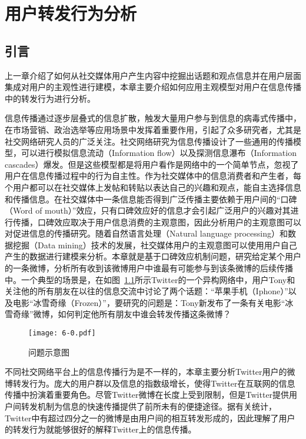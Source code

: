 \chapter{用户转发行为分析}
\label{ch6}

\section{引言}
\label{ch6_intro}
上一章介绍了如何从社交媒体用户产生内容中挖掘出话题和观点信息并在用户层面集成对用户的主观性进行建模，本章主要介绍如何应用主观模型对用户在信息传播中的转发行为进行分析。

信息传播通过逐步层叠式的信息扩散，触发大量用户参与到信息的病毒式传播中，在市场营销、政治选举等应用场景中发挥着重要作用，引起了众多研究者，尤其是社交网络研究人员的广泛关注。社交网络研究为信息传播设计了一些通用的传播模型，可以进行模拟信息流动（Information flow）以及探测信息瀑布（Information cascades）爆发。但是这些模型都是将用户看作是网络中的一个简单节点，忽视了用户在信息传播过程中的行为自主性。作为社交媒体中的信息消费者和产生者，每个用户都可以在社交媒体上发帖和转贴以表达自己的兴趣和观点，能自主选择信息和传播信息。在社交媒体中一条信息能否得到广泛传播主要依赖于用户间的“口碑（Word of mouth）”效应，只有口碑效应好的信息才会引起广泛用户的兴趣对其进行传播，口碑效应取决于用户信息消费的主观意图，因此分析用户的主观意图可以对促进信息的传播研究。随着自然语言处理（Natural language processing）和数据挖掘（Data mining）技术的发展，社交媒体用户的主观意图可以使用用户自己产生的数据进行建模来分析。本章就是基于口碑效应机制问题，研究给定某个用户的一条微博，分析所有收到该微博用户中谁最有可能参与到该条微博的后续传播中。一个典型的场景是，在如图~\ref{fig6-0}所示Twitter的一个异构网络中，用户Tony和关注他的所有朋友在以往的信息交流中讨论了两个话题：“苹果手机（Iphone）”以及电影“冰雪奇缘（Frozen）”，要研究的问题是：Tony新发布了一条有关电影“冰雪奇缘”微博，如何判定他所有朋友中谁会转发传播这条微博？

\begin{figure}[htb]
\centering
\texttt{[image: 6-0.pdf]}
\caption{问题示意图}
\label{fig6-0}
\end{figure}

不同社交网络平台上的信息传播行为是不一样的，本章主要分析Twitter用户的微博转发行为。庞大的用户群以及信息的指数级增长，使得Twitter在互联网的信息传播中扮演着重要角色。尽管Twitter微博在长度上受到限制，但是Twitter提供用户间转发机制为信息的快速传播提供了前所未有的便捷途径。据有关统计，Twitter中有超过四分之一的微博是由用户间的相互转发形成的，因此理解了用户的转发行为就能够很好的解释Twitter上的信息传播。

